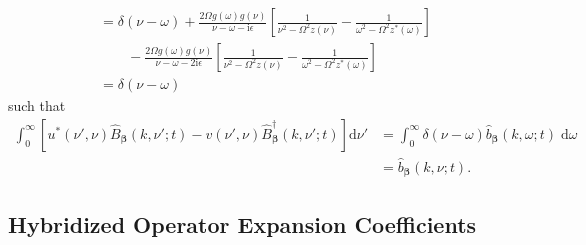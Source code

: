 \begin{equation}
\begin{split}
&= \delta(\nu - \omega) + \frac{2\Omega g(\omega)g(\nu)}{\nu - \omega - \mathrm{i}\epsilon}\left[\frac{1}{\nu^2 - \Omega^2z(\nu)} - \frac{1}{\omega^2 - \Omega^2z^*(\omega)}\right]\\
&\qquad - \frac{2\Omega g(\omega)g(\nu)}{\nu - \omega - 2\mathrm{i}\epsilon}\left[\frac{1}{\nu^2 - \Omega^2z(\nu)} - \frac{1}{\omega^2 - \Omega^2z^*(\omega)}\right]\\
&= \delta(\nu - \omega)
\end{split}
\end{equation}
such that
\begin{equation}
\begin{split}
\int_0^\infty\left[u^*(\nu',\nu)\hat{B}_{\bm{\beta}}(k,\nu';t) - v(\nu',\nu)\hat{B}_{\bm{\beta}}^\dagger(k,\nu';t)\right]\mathrm{d}\nu' &= \int_0^\infty\delta(\nu - \omega)\hat{b}_{\bm{\beta}}(k,\omega;t)\;\mathrm{d}\omega\\
&= \hat{b}_{\bm{\beta}}(k,\nu;t).
\end{split}
\end{equation}








\subsection{Hybridized Operator Expansion Coefficients}

